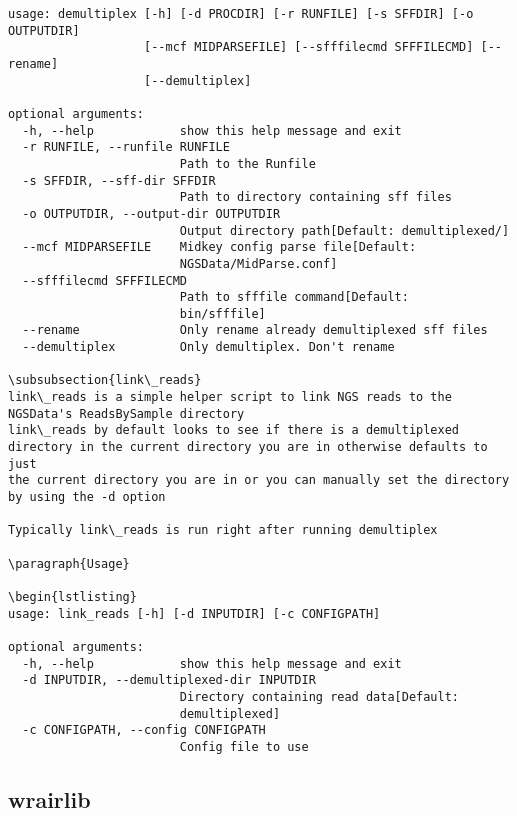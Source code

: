 \documentclass{article}
\begin{document}
\begin{lstlisting}
usage: demultiplex [-h] [-d PROCDIR] [-r RUNFILE] [-s SFFDIR] [-o OUTPUTDIR]
                   [--mcf MIDPARSEFILE] [--sfffilecmd SFFFILECMD] [--rename]
                   [--demultiplex]

optional arguments:
  -h, --help            show this help message and exit
  -r RUNFILE, --runfile RUNFILE
                        Path to the Runfile
  -s SFFDIR, --sff-dir SFFDIR
                        Path to directory containing sff files
  -o OUTPUTDIR, --output-dir OUTPUTDIR
                        Output directory path[Default: demultiplexed/]
  --mcf MIDPARSEFILE    Midkey config parse file[Default:
                        NGSData/MidParse.conf]
  --sfffilecmd SFFFILECMD
                        Path to sfffile command[Default:
                        bin/sfffile]
  --rename              Only rename already demultiplexed sff files
  --demultiplex         Only demultiplex. Don't rename

\subsubsection{link\_reads}
link\_reads is a simple helper script to link NGS reads to the NGSData's ReadsBySample directory
link\_reads by default looks to see if there is a demultiplexed directory in the current directory you are in otherwise defaults to just
the current directory you are in or you can manually set the directory by using the -d option

Typically link\_reads is run right after running demultiplex

\paragraph{Usage}

\begin{lstlisting}
usage: link_reads [-h] [-d INPUTDIR] [-c CONFIGPATH]

optional arguments:
  -h, --help            show this help message and exit
  -d INPUTDIR, --demultiplexed-dir INPUTDIR
                        Directory containing read data[Default:
                        demultiplexed]
  -c CONFIGPATH, --config CONFIGPATH
                        Config file to use
\end{lstlisting}

\subsection{wrairlib}
\end{document}
